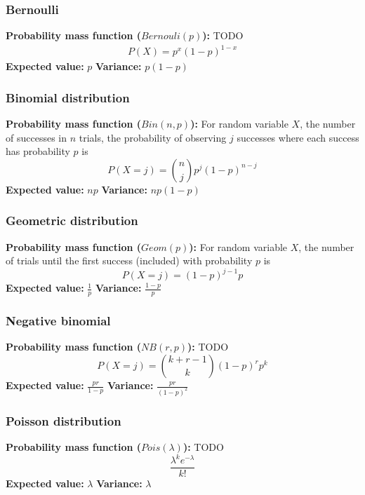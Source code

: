 \documentclass{article}
\begin{document}
\subsubsection{Bernoulli}
\textbf{Probability mass function ($Bernouli(p)$):} TODO
\begin{align*}
    P(X) = p^x(1-p)^{1-x}
\end{align*}
\textbf{Expected value:} $p$
\textbf{Variance:} $p(1-p)$

\subsubsection{Binomial distribution}
\textbf{Probability mass function ($Bin(n,p)$):} For random variable $X$, the number of successes in $n$ trials, the probability of observing $j$ successes where each success has probability $p$ is
\begin{equation*}
    P(X = j) = {n \choose j} p^j (1 - p)^{n-j}
\end{equation*}
\textbf{Expected value:} $np$
\textbf{Variance:} $np(1-p)$

\subsubsection{Geometric distribution}
\textbf{Probability mass function ($Geom(p)$):} For random variable $X$, the number of trials until the first success (included) with probability $p$ is
\begin{equation*}
    P(X=j) = (1-p)^{j-1}p
\end{equation*}
\textbf{Expected value:} $\frac{1}{p}$
\textbf{Variance:} $\frac{1-p}{p}$

\subsubsection{Negative binomial}
\textbf{Probability mass function ($NB(r, p)$):} TODO
\begin{equation*}
	P(X = j) = {k + r - 1 \choose k} (1-p)^rp^k
\end{equation*}
\textbf{Expected value:} $\frac{pr}{1-p}$
\textbf{Variance:} $\frac{pr}{(1 - p)^2}$

\subsubsection{Poisson distribution}
\textbf{Probability mass function ($Pois(\lambda)$):} TODO
\begin{equation*}
	\frac{\lambda^ke^{-\lambda}}{k!}
\end{equation*}
\textbf{Expected value:} $\lambda$
\textbf{Variance:} $\lambda$
\end{document}

